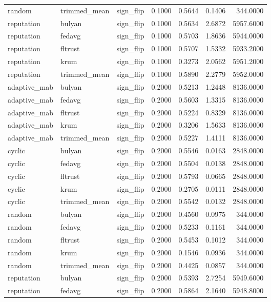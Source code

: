 \begin{tabular}{lllrrrr}
random & trimmed_mean & sign_flip & 0.1000 & 0.5644 & 0.1406 & 344.0000 \\
reputation & bulyan & sign_flip & 0.1000 & 0.5634 & 2.6872 & 5957.6000 \\
reputation & fedavg & sign_flip & 0.1000 & 0.5703 & 1.8636 & 5944.0000 \\
reputation & fltrust & sign_flip & 0.1000 & 0.5707 & 1.5332 & 5933.2000 \\
reputation & krum & sign_flip & 0.1000 & 0.3273 & 2.0562 & 5951.2000 \\
reputation & trimmed_mean & sign_flip & 0.1000 & 0.5890 & 2.2779 & 5952.0000 \\
adaptive_mab & bulyan & sign_flip & 0.2000 & 0.5213 & 1.2448 & 8136.0000 \\
adaptive_mab & fedavg & sign_flip & 0.2000 & 0.5603 & 1.3315 & 8136.0000 \\
adaptive_mab & fltrust & sign_flip & 0.2000 & 0.5224 & 0.8329 & 8136.0000 \\
adaptive_mab & krum & sign_flip & 0.2000 & 0.3206 & 1.5633 & 8136.0000 \\
adaptive_mab & trimmed_mean & sign_flip & 0.2000 & 0.5227 & 1.4111 & 8136.0000 \\
cyclic & bulyan & sign_flip & 0.2000 & 0.5546 & 0.0163 & 2848.0000 \\
cyclic & fedavg & sign_flip & 0.2000 & 0.5504 & 0.0138 & 2848.0000 \\
cyclic & fltrust & sign_flip & 0.2000 & 0.5793 & 0.0665 & 2848.0000 \\
cyclic & krum & sign_flip & 0.2000 & 0.2705 & 0.0111 & 2848.0000 \\
cyclic & trimmed_mean & sign_flip & 0.2000 & 0.5542 & 0.0132 & 2848.0000 \\
random & bulyan & sign_flip & 0.2000 & 0.4560 & 0.0975 & 344.0000 \\
random & fedavg & sign_flip & 0.2000 & 0.5233 & 0.1161 & 344.0000 \\
random & fltrust & sign_flip & 0.2000 & 0.5453 & 0.1012 & 344.0000 \\
random & krum & sign_flip & 0.2000 & 0.1546 & 0.0936 & 344.0000 \\
random & trimmed_mean & sign_flip & 0.2000 & 0.4425 & 0.0857 & 344.0000 \\
reputation & bulyan & sign_flip & 0.2000 & 0.5393 & 2.7254 & 5949.6000 \\
reputation & fedavg & sign_flip & 0.2000 & 0.5864 & 2.1640 & 5948.8000 \\

\end{tabular}
